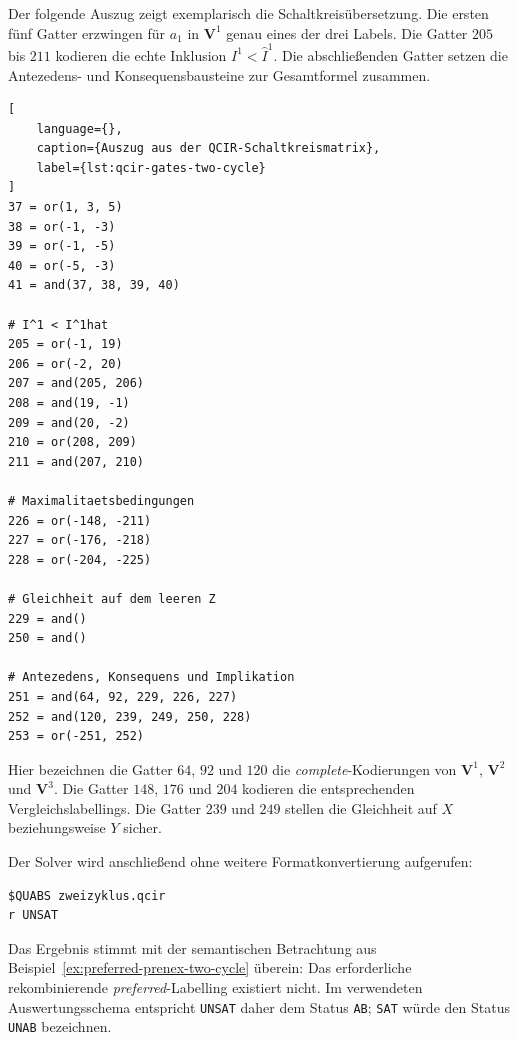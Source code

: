 Der folgende Auszug zeigt exemplarisch die Schaltkreisübersetzung. Die
ersten fünf Gatter erzwingen für \(a_1\) in \(\mathbf V^1\) genau eines
der drei Labels. Die Gatter \(205\) bis \(211\) kodieren die echte
Inklusion \(I^1<\widehat I^1\). Die abschließenden Gatter setzen die
Antezedens- und Konsequensbausteine zur Gesamtformel zusammen.
\begin{lstlisting}[
    language={},
    caption={Auszug aus der QCIR-Schaltkreismatrix},
    label={lst:qcir-gates-two-cycle}
]
37 = or(1, 3, 5)
38 = or(-1, -3)
39 = or(-1, -5)
40 = or(-5, -3)
41 = and(37, 38, 39, 40)

# I^1 < I^1hat
205 = or(-1, 19)
206 = or(-2, 20)
207 = and(205, 206)
208 = and(19, -1)
209 = and(20, -2)
210 = or(208, 209)
211 = and(207, 210)

# Maximalitaetsbedingungen
226 = or(-148, -211)
227 = or(-176, -218)
228 = or(-204, -225)

# Gleichheit auf dem leeren Z
229 = and()
250 = and()

# Antezedens, Konsequens und Implikation
251 = and(64, 92, 229, 226, 227)
252 = and(120, 239, 249, 250, 228)
253 = or(-251, 252)
\end{lstlisting}
Hier bezeichnen die Gatter \(64\), \(92\) und \(120\) die
\emph{complete}-Kodierungen von
\(\mathbf V^1\), \(\mathbf V^2\) und \(\mathbf V^3\). Die Gatter
\(148\), \(176\) und \(204\) kodieren die entsprechenden
Vergleichslabellings. Die Gatter \(239\) und \(249\) stellen die
Gleichheit auf \(X\) beziehungsweise \(Y\) sicher.

Der Solver wird anschließend ohne weitere Formatkonvertierung
aufgerufen:
\begin{lstlisting}[language={}]
$QUABS zweizyklus.qcir
r UNSAT
\end{lstlisting}
Das Ergebnis stimmt mit der semantischen Betrachtung aus
Beispiel~\ref{ex:preferred-prenex-two-cycle} überein: Das erforderliche
rekombinierende \emph{preferred}-Labelling existiert nicht. Im
verwendeten Auswertungsschema entspricht \texttt{UNSAT} daher dem
Status \texttt{AB}; \texttt{SAT} würde den Status \texttt{UNAB}
bezeichnen.


